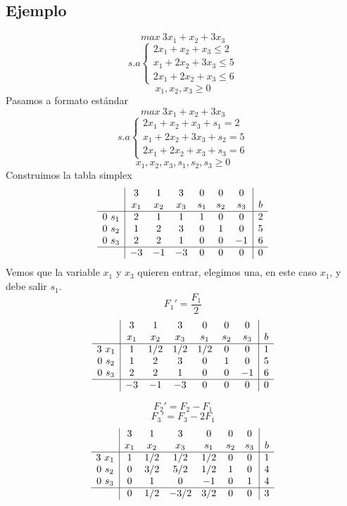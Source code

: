 \documentclass[11pt,fleqn]{book} %
\begin{document}
\subsection{Ejemplo}
$$  max ~ 3x_1+x_2+3x_3$$
$$ s.a \left\{
\begin{array}{c}
  2x_1+x_2+x_3\leq2\\
  x_1+2x_2+3x_3\leq 5 \\
  2x_1+2x_2+x_3\leq 6
\end{array}
\right.
$$
$$x_1, x_2, x_3\geq 0$$
Pasamos a formato estándar
$$  max ~ 3x_1+x_2+3x_3$$
$$ s.a \left\{
\begin{array}{c}
  2x_1+x_2+x_3 + s_1=2\\
  x_1+2x_2+3x_3+ s_2 = 5 \\
  2x_1+2x_2+x_3 + s_3=  6
\end{array}
\right.
$$
$$x_1, x_2, x_3, s_1, s_2, s_3 \geq 0$$
Construimos la tabla simplex
$$
\begin{array}{c|cccccc|c}
  & 3 & 1 & 3 & 0 & 0 & 0 &  \\
  & x_1 & x_2 & x_3 & s_1 & s_2 & s_3 & b \\ \hline
  0 ~ s_1 & 2 & 1 & 1 & 1 & 0 & 0 & 2 \\
  0 ~ s_2 & 1 & 2 & 3 & 0 & 1 & 0 & 5 \\
  0 ~ s_3 & 2 & 2 & 1 & 0 & 0 & -1 & 6 \\ \hline
  & -3 & -1 & -3 & 0 & 0 & 0 & 0
\end{array}
$$
Vemos que la variable $x_1$ y $x_3$ quieren entrar, elegimos una, en este caso $x_1$, y debe salir $s_1$. 
$$ F_1'=\frac{F_1}{2} $$
$$
\begin{array}{c|cccccc|c}
  & 3 & 1 & 3 & 0 & 0 & 0 &  \\
  & x_1 & x_2 & x_3 & s_1 & s_2 & s_3 & b \\ \hline
  3 ~ x_1 & 1 & 1/2 & 1/2 & 1/2 & 0 & 0 & 1 \\
  0 ~ s_2 & 1 & 2 & 3 & 0 & 1 & 0 & 5 \\
  0 ~ s_3 & 2 & 2 & 1 & 0 & 0 & -1 & 6 \\ \hline
  & -3 & -1 & -3 & 0 & 0 & 0 & 0
\end{array}
$$

$$ F_2'=F_2-F_1 $$
$$ F_3'=F_3-2F_1 $$
$$
\begin{array}{c|cccccc|c}
  & 3 & 1 & 3 & 0 & 0 & 0 &  \\
  & x_1 & x_2 & x_3 & s_1 & s_2 & s_3 & b \\ \hline
  3 ~ x_1 & 1 & 1/2 & 1/2 & 1/2 & 0 & 0 & 1 \\
  0 ~ s_2 & 0 & 3/2 & 5/2 & 1/2 & 1 & 0 & 4 \\
  0 ~ s_3 & 0 & 1 & 0 & -1 & 0 & 1 & 4 \\ \hline
  & 0 & 1/2 & -3/2 & 3/2 & 0 & 0 & 3
\end{array}
$$
\end{document}

